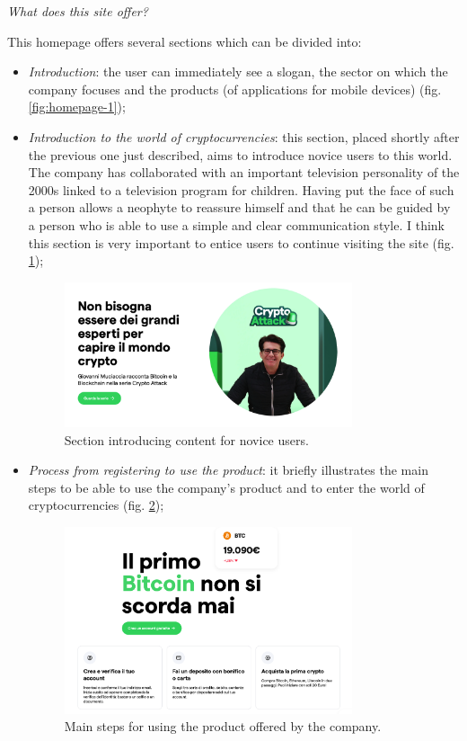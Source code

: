 \centerline{\textit{What does this site offer?}}
This homepage offers several sections which can be divided into:
\begin{itemize}
  \item \textit{Introduction}: the user can immediately see a slogan, the 
  sector on which the company focuses and the products (of applications for 
  mobile devices) (fig. \ref{fig:homepage-1});

  \item \textit{Introduction to the world of cryptocurrencies}: this 
  section, placed shortly after the previous one just described, aims to 
  introduce novice users to this world. The company has collaborated with 
  an important television personality of the 2000s linked to a television 
  program for children. Having put the face of such a person allows a 
  neophyte to reassure himself and that he can be guided by a person who is 
  able to use a simple and clear communication style. I think this section 
  is very important to entice users to continue visiting the site 
  (fig. \ref{fig:introduction-1});
  \begin{figure}[H]
    \centering
    \includegraphics[width=0.80\textwidth]{res/images/introduction-1.png}
    \caption{Section introducing content for novice users.}
    \label{fig:introduction-1}
  \end{figure}

  \item \textit{Process from registering to use the product}: it briefly 
  illustrates the main steps to be able to use the company's product and to 
  enter the world of cryptocurrencies (fig. \ref{fig:registration-process});
  \begin{figure}[H]
    \centering
    \includegraphics[width=0.80\textwidth]{res/images/registration-process.png}
    \caption{Main steps for using the product offered by the company.}
    \label{fig:registration-process}
  \end{figure}


\end{itemize}
